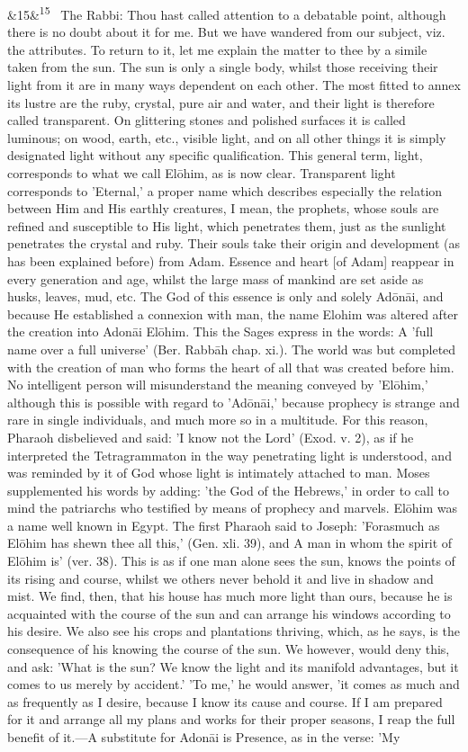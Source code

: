 \documentclass[12pt]{article}
\newcommand{\para}[1][]{\par\noindent\ifx&#1&\else\textsuperscript{\footnotesize #1}~\fi}
\begin{document}
\para[15] The Rabbi: Thou hast called attention to a debatable point, although there is no doubt about it for me. But we have wandered from our subject, viz. the attributes. To return to it, let me explain the matter to thee by a simile taken from the sun. The sun is only a single body, whilst those receiving their light from it are in many ways dependent on each other. The most fitted to annex its lustre are the ruby, crystal, pure air and water, and their light is therefore called transparent. On glittering stones and polished surfaces it is called luminous; on wood, earth, etc., visible light, and on all other things it is simply designated light without any specific qualification. This general term, light, corresponds to what we call Elōhim, as is now clear. Transparent light corresponds to 'Eternal,' a proper name which describes especially the relation between Him and His earthly creatures, I mean, the prophets, whose souls are refined and susceptible to His light, which penetrates them, just as the sunlight penetrates the crystal and ruby. Their souls take their origin and development (as has been explained before) from Adam. Essence and heart [of Adam] reappear in every generation and age, whilst the large mass of mankind are set aside as husks, leaves, mud, etc. The God of this essence is only and solely Adōnāi, and because He established a connexion with man, the name Elohim was altered after the creation into Adonāi Elōhim. This the Sages express in the words: A 'full name over a full universe' (Ber. Rabbāh chap. xi.). The world was but completed with the creation of man who forms the heart of all that was created before him. No intelligent person will misunderstand the meaning conveyed by 'Elōhim,' although this is possible with regard to 'Adōnāi,' because prophecy is strange and rare in single individuals, and much more so in a multitude. For this reason, Pharaoh disbelieved and said: 'I know not the Lord' (Exod. v. 2), as if he interpreted the Tetragrammaton in the way penetrating light is understood, and was reminded by it of God whose light is intimately attached to man. Moses supplemented his words by adding: 'the God of the Hebrews,' in order to call to mind the patriarchs who testified by means of prophecy and marvels. Elōhim was a name well known in Egypt. The first Pharaoh said to Joseph: 'Forasmuch as Elōhim has shewn thee all this,' (Gen. xli. 39), and A man in whom the spirit of Elōhim is' (ver. 38). This is as if one man alone sees the sun, knows the points of its rising and course, whilst we others never behold it and live in shadow and mist. We find, then, that his house has much more light than ours, because he is acquainted with the course of the sun and can arrange his windows according to his desire. We also see his crops and plantations thriving, which, as he says, is the consequence of his knowing the course of the sun. We however, would deny this, and ask: 'What is the sun? We know the light and its manifold advantages, but it comes to us merely by accident.' 'To me,' he would answer, 'it comes as much and as frequently as I desire, because I know its cause and course. If I am prepared for it and arrange all my plans and works for their proper seasons, I reap the full benefit of it.---A substitute for Adonāi is Presence, as in the verse: 'My 
\end{document}
